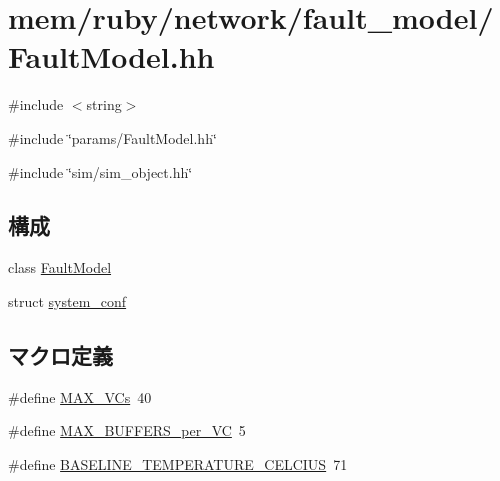 \hypertarget{FaultModel_8hh}{
\section{mem/ruby/network/fault\_\-model/FaultModel.hh}
\label{FaultModel_8hh}
}
{\ttfamily \#include $<$string$>$}\par
{\ttfamily \#include \char`\"{}params/FaultModel.hh\char`\"{}}\par
{\ttfamily \#include \char`\"{}sim/sim\_\-object.hh\char`\"{}}\par
\subsection*{構成}
\begin{DoxyCompactItemize}
\item 
class \hyperlink{classFaultModel}{FaultModel}
\item 
struct \hyperlink{structFaultModel_1_1system__conf}{system\_\-conf}
\end{DoxyCompactItemize}
\subsection*{マクロ定義}
\begin{DoxyCompactItemize}
\item 
\#define \hyperlink{FaultModel_8hh_a9a3db37b47be93a561643b04afb37303}{MAX\_\-VCs}~40
\item 
\#define \hyperlink{FaultModel_8hh_ae962d9d6a16983055ca17865b95be5f1}{MAX\_\-BUFFERS\_\-per\_\-VC}~5
\item 
\#define \hyperlink{FaultModel_8hh_ac6d4824e8c19e85640d24090644abef8}{BASELINE\_\-TEMPERATURE\_\-CELCIUS}~71
\end{DoxyCompactItemize}



